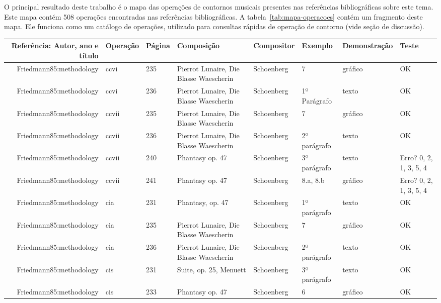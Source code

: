 \documentclass[11pt]{article}
\begin{document}
\label{sec:resultados}


O principal resultado deste trabalho é o mapa das operações de
contornos musicais presentes nas referências bibliográficas sobre este
tema. Este mapa contém 508 operações encontradas nas referências
bibliográficas. A tabela~\ref{tab:mapa-operacoes} contém um fragmento
deste mapa. Ele funciona como um catálogo de operações, utilizado para
consultas rápidas de operação de contorno (vide seção de discussão).

\begin{table}
  \centering
  \begin{tabular}{r|lllllll}
    Referência: Autor, ano e título&Operação&Página&Composição&Compositor&Exemplo&Demonstração&Teste\\
    \hline
    Friedmann85:methodology&ccvi&235&Pierrot Lunaire, Die Blasse Waescherin&Schoenberg&7&gráfico&OK\\
    Friedmann85:methodology&ccvi&236&Pierrot Lunaire, Die Blasse Waescherin&Schoenberg&1º Parágrafo&texto&OK\\
    Friedmann85:methodology&ccvii&235&Pierrot Lunaire, Die Blasse Waescherin&Schoenberg&7&gráfico&OK\\
    Friedmann85:methodology&ccvii&236&Pierrot Lunaire, Die Blasse Waescherin&Schoenberg&2º parágrafo&texto&OK\\
    Friedmann85:methodology&ccvii&240&Phantasy op. 47&Schoenberg&3º parágrafo&texto&Erro? 0, 2, 1, 3, 5, 4\\
    Friedmann85:methodology&ccvii&241&Phantasy op. 47&Schoenberg&8.a, 8.b&gráfico&Erro? 0, 2, 1, 3, 5, 4\\
    Friedmann85:methodology&cia&231&Phantasy, op. 47&Schoenberg&1º parágrafo&texto&OK\\
    Friedmann85:methodology&cia&235&Pierrot Lunaire, Die Blasse Waescherin&Schoenberg&7&gráfico&OK\\
    Friedmann85:methodology&cia&236&Pierrot Lunaire, Die Blasse Waescherin&Schoenberg&2º parágrafo&texto&OK\\
    Friedmann85:methodology&cis&231&Suite, op. 25, Menuett&Schoenberg&3º parágrafo&texto&OK\\
    Friedmann85:methodology&cis&233&Phantasy op. 47&Schoenberg&6&gráfico&OK\\

\end{tabular}
\end{table}
\end{document}
